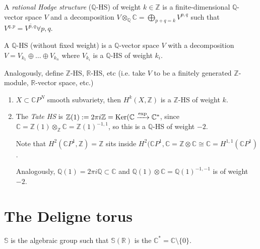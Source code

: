 \begin{definition}
\label{definition-rational-hodge-structure}
A {\it rational Hodge structure}
($\mathbb{Q}$-HS)
of weight $k\in\mathbb{Z}$ is a
finite-dimensional
$\mathbb{Q}$-vector space $V$
and a decomposition $V \otimes_{\mathbb{Q}}
\mathbb{C}
=\bigoplus_{p+q=k}V^{p,q}$
such that
$V^{q,p}=\overline{V^{p,q}}\forall p,q$.

A $\mathbb{Q}$-HS (without fixed weight)
is a $\mathbb{Q}$-vector space $V$
with a decomposition
$V=V_{k_1}\oplus … \oplus V_{k_n}$
where $V_{k_i}$ is a $\mathbb{Q}$-HS
of weight $k_i$.

Analogously, define $\mathbb{Z}$-HS,
$\mathbb{R}$-HS, etc
(i.e. take $V$ to be a finitely generated
$\mathbb{Z}$-module, $\mathbb{R}$-vector
space, etc.)
\end{definition}

\begin{example}
\label{example-hodge-structures}
\begin{enumerate}
\item $X \subset \mathbb{C}P^N$ smooth
subvariety,
then $H^k(X,\mathbb{Z})$ is a $\mathbb{Z}$-HS
of weight $k$.

\item The {\it Tate HS} is
$\mathbb{Z}(1):=2\pi i\mathbb{Z}
=\mathop{\mathrm{Ker}}(\mathbb{C}\xrightarrow{\text{exp}}
\mathbb{C}^*$,
since $\mathbb{C}=
\mathbb{Z}(1)\otimes_{\mathbb{Z}}\mathbb{C}=
\mathbb{Z}(1)^{-1,1}$,
so this is a $\mathbb{Q}$-HS of weight $-2$.

Note that
$H^2(\mathbb{C}P^1,\mathbb{Z})=\mathbb{Z}$
sits inside
$H^2(\mathbb{C}P^1,\mathbb{C}=\mathbb{Z}
\otimes\mathbb{C}
\cong \mathbb{C}
=H^{1,1}(\mathbb{C}P^1)$.

Analogously,
$\mathbb{Q}(1)=2\pi i\mathbb{Q} \subset
\mathbb{C}$
and $\mathbb{Q}(1)\otimes
\mathbb{C}=\mathbb{Q}(1)^{-1,-1}$
is of weight $-2$.
\end{enumerate}
\end{example}

\section{The Deligne torus}
\label{section-deligne-torus}

\begin{definition}
\label{definition-deligne-torus}
$\mathbb{S}$ is the algebraic group such that
$\mathbb{S}(\mathbb{R})$ is the
$\mathbb{C}^*=\mathbb{C}\setminus\{0\}$.
\end{definition}

